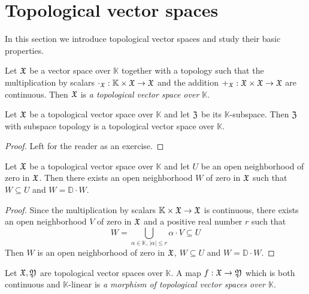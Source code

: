 \section{Topological vector spaces}
\noindent
In this section we introduce topological vector spaces and study their basic properties.

\begin{definition}
   Let ${\mathfrak X}$ be a vector space over $\mathbb{K}$ together with a topology such that the multiplication by scalars $\cdot_{{\mathfrak X}}:\mathbb{K}\times {\mathfrak X} \rightarrow {\mathfrak X}$ and the addition $+_{{\mathfrak X}}:{\mathfrak X}\times {\mathfrak X}\rightarrow {\mathfrak X}$ are continuous. Then ${\mathfrak X}$ is \textit{a topological vector space over $\mathbb{K}$}.
\end{definition}

\begin{fact}\label{fact:topological_vector_subspaces}
   Let ${\mathfrak X}$ be a topological vector space over $\mathbb{K}$ and let ${\mathfrak Z}$ be its $\mathbb{K}$-subspace. Then ${\mathfrak Z}$ with subspace topology is a topological vector space over $\mathbb{K}$.
\end{fact}
\begin{proof}
   Left for the reader as an exercise.
\end{proof}

\begin{fact}\label{fact:supercircled_open_basis_at_zero}
   Let ${\mathfrak X}$ be a topological vector space over $\mathbb{K}$ and let $U$ be an open neighborhood of zero in ${\mathfrak X}$. Then there exists an open neighborhood $W$ of zero in ${\mathfrak X}$ such that $W \subseteq U$ and $W = \mathbb{D}\cdot W$.
\end{fact}
\begin{proof}
   Since the multiplication by scalars $\mathbb{K}\times {\mathfrak X} \rightarrow {\mathfrak X}$ is continuous, there exists an open neighborhood $V$ of zero in ${\mathfrak X}$ and a positive real number $r$ such that
   $$W = \bigcup_{\alpha\in \mathbb{K},\,|\alpha| \leq r}\alpha \cdot V \subseteq U$$
   Then $W$ is an open neighborhood of zero in ${\mathfrak X}$, $W\subseteq U$ and $W = \mathbb{D}\cdot W$.
\end{proof}

\begin{definition}
   Let ${\mathfrak X},{\mathfrak Y}$ are topological vector spaces over $\mathbb{K}$. A map $f:{\mathfrak X}\rightarrow {\mathfrak Y}$ which is both continuous and $\mathbb{K}$-linear is \textit{a morphism of topological vector spaces over $\mathbb{K}$}.
\end{definition}


